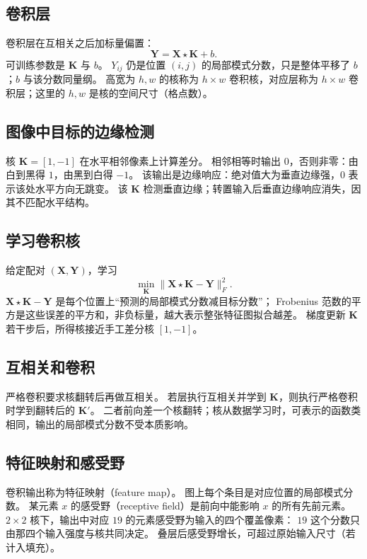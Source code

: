 \subsection{卷积层}

卷积层在互相关之后加标量偏置：
\[
\bm{Y}=\bm{X}\star\bm{K}+b.
\]
可训练参数是 $\bm{K}$ 与 $b$。
$Y_{ij}$ 仍是位置 $(i,j)$ 的局部模式分数，只是整体平移了 $b$；$b$ 与该分数同量纲。
高宽为 $h,w$ 的核称为 $h\times w$ 卷积核，对应层称为 $h\times w$ 卷积层；这里的 $h,w$ 是核的空间尺寸（格点数）。

\subsection{图像中目标的边缘检测}

核 $\bm{K}=[1,-1]$ 在水平相邻像素上计算差分。
相邻相等时输出 $0$，否则非零：由白到黑得 $1$，由黑到白得 $-1$。
该输出是边缘响应：绝对值大为垂直边缘强，$0$ 表示该处水平方向无跳变。
该 $\bm{K}$ 检测垂直边缘；转置输入后垂直边缘响应消失，因其不匹配水平结构。

\subsection{学习卷积核}

给定配对 $(\bm{X},\bm{Y})$，学习
\[
\min_{\bm{K}}
\bigl\|\bm{X}\star\bm{K}-\bm{Y}\bigr\|_{F}^{2}.
\]
$\bm{X}\star\bm{K}-\bm{Y}$ 是每个位置上“预测的局部模式分数减目标分数”；
Frobenius 范数的平方是这些误差的平方和，非负标量，越大表示整张特征图拟合越差。
梯度更新 $\bm{K}$ 若干步后，所得核接近手工差分核 $[1,-1]$。

\subsection{互相关和卷积}

严格卷积要求核翻转后再做互相关。
若层执行互相关并学到 $\bm{K}$，则执行严格卷积时学到翻转后的 $\bm{K}'$。
二者前向差一个核翻转；核从数据学习时，可表示的函数类相同，输出的局部模式分数不受本质影响。

\subsection{特征映射和感受野}

卷积输出称为特征映射（feature map）。
图上每个条目是对应位置的局部模式分数。
某元素 $x$ 的感受野（receptive field）是前向中能影响 $x$ 的所有先前元素。
$2\times 2$ 核下，输出中对应 $19$ 的元素感受野为输入的四个覆盖像素：
$19$ 这个分数只由那四个输入强度与核共同决定。
叠层后感受野增长，可超过原始输入尺寸（若计入填充）。

